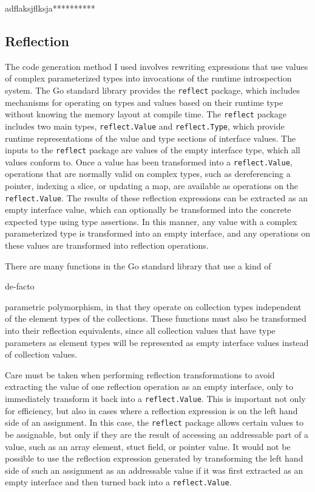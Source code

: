 \documentclass[letterpaper,twocolumn,11pt]{article}
\begin{document}
adflaksjflksja**********

\subsection{Reflection} \label{reflection}

The code generation method I used involves rewriting expressions that use values of complex parameterized types into invocations of the runtime introspection system. The Go standard library provides the \texttt{reflect} package, which includes mechanisms for operating on types and values based on their runtime type without knowing the memory layout at compile time. The \texttt{reflect} package includes two main types, \texttt{reflect.Value} and \texttt{reflect.Type}, which provide runtime representations of the value and type sections of interface values. The inputs to the \texttt{reflect} package are values of the empty interface type, which all values conform to. Once a value has been transformed into a \texttt{reflect.Value}, operations that are normally valid on complex types, such as dereferencing a pointer, indexing a slice, or updating a map, are available as operations on the \texttt{reflect.Value}. The results of these reflection expressions can be extracted as an empty interface value, which can optionally be transformed into the concrete expected type using type assertions. In this manner, any value with a complex parameterized type is transformed into an empty interface, and any operations on these values are transformed into reflection operations.

There are many functions in the Go standard library that use a kind of \begin{em}de-facto\end{em} parametric polymorphism, in that they operate on collection types independent of the element types of the collections. These functions must also be transformed into their reflection equivalents, since all collection values that have type parameters as element types will be represented as empty interface values instead of collection values.

Care must be taken when performing reflection transformations to avoid extracting the value of one reflection operation as an empty interface, only to immediately transform it back into a \texttt{reflect.Value}. This is important not only for efficiency, but also in cases where a reflection expression is on the left hand side of an assignment. In this case, the \texttt{reflect} package allows certain values to be assignable, but only if they are the result of accessing an addressable part of a value, such as an array element, stuct field, or pointer value. It would not be possible to use the reflection expression generated by transforming the left hand side of such an assignment as an addressable value if it was first extracted as an empty interface and then turned back into a \texttt{reflect.Value}.
\end{document}
